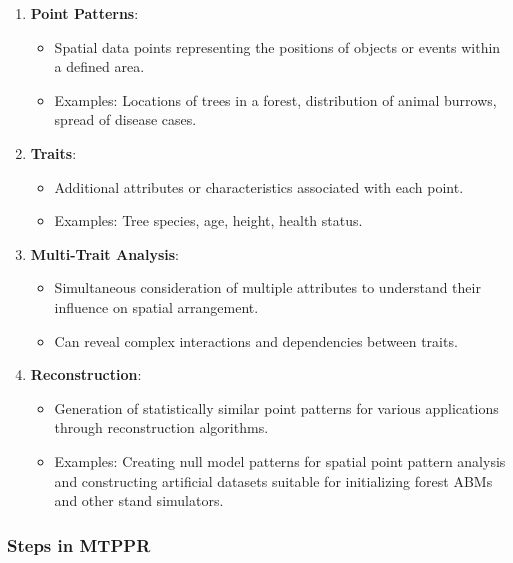 \documentclass[
  letterpaper,
  DIV=11,
  numbers=noendperiod]{scrreprt}
\begin{document}
\begin{enumerate}
\def\labelenumi{\arabic{enumi}.}
\item
  \textbf{Point Patterns}:

  \begin{itemize}
  \item
    Spatial data points representing the positions of objects or events
    within a defined area.
  \item
    Examples: Locations of trees in a forest, distribution of animal
    burrows, spread of disease cases.
  \end{itemize}
\item
  \textbf{Traits}:

  \begin{itemize}
  \item
    Additional attributes or characteristics associated with each point.
  \item
    Examples: Tree species, age, height, health status.
  \end{itemize}
\item
  \textbf{Multi-Trait Analysis}:

  \begin{itemize}
  \item
    Simultaneous consideration of multiple attributes to understand
    their influence on spatial arrangement.
  \item
    Can reveal complex interactions and dependencies between traits.
  \end{itemize}
\item
  \textbf{Reconstruction}:

  \begin{itemize}
  \item
    Generation of statistically similar point patterns for various
    applications through reconstruction algorithms.
  \item
    Examples: Creating null model patterns for spatial point pattern
    analysis and constructing artificial datasets suitable for
    initializing forest ABMs and other stand simulators.
  \end{itemize}
\end{enumerate}

\subsubsection*{Steps in MTPPR}\label{steps-in-mtppr}
\end{document}

